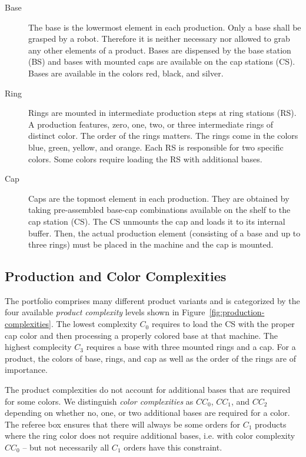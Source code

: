 \documentclass[12pt,twoside]{article}
\newcommand{\reffig}[1]{Figure~\ref{#1}}
\begin{document}
\begin{description}
\item[Base] The base is the lowermost element in each production. Only
  a base shall be grasped by a robot. Therefore it is neither
  necessary nor allowed to grab any other elements of a product. Bases
  are dispensed by the base station (BS) and bases with mounted caps
  are available on the cap stations (CS). Bases are available in the
  colors red, black, and silver.
\item[Ring] Rings are mounted in intermediate production steps at ring
  stations (RS). A production features, zero, one, two, or three
  intermediate rings of distinct color. The order of the rings
  matters. The rings come in the colors blue, green, yellow, and
  orange. Each RS is responsible for two specific colors. Some colors
  require loading the RS with additional bases.
\item[Cap] Caps are the topmost element in each production. They are
  obtained by taking pre-assembled base-cap combinations available on
  the shelf to the cap station (CS). The CS unmounts the cap and loads
  it to its internal buffer. Then, the actual production element
  (consisting of a base and up to three rings) must be placed in the
  machine and the cap is mounted.
\end{description}

\subsection{Production and Color Complexities}
\label{sec:production-complexities}
The portfolio comprises many different product variants and is
categorized by the four available \emph{product complexity} levels
shown in \reffig{fig:production-complexities}. The lowest complexity
$C_0$ requires to load the CS with the proper cap color and then
processing a properly colored base at that machine. The highest
complecity $C_3$ requires a base with three mounted rings and a
cap. For a product, the colors of base, rings, and cap as well as the
order of the rings are of importance.

The product complexities do not account for additional bases that are
required for some colors. We distinguish \emph{color complexities} as
$CC_0$, $CC_1$, and $CC_2$ depending on whether no, one, or two
additional bases are required for a color. The referee box ensures
that there will always be some orders for $C_1$ products where the
ring color does not require additional bases, i.e. with color
complexity $CC_0$ -- but not necessarily all $C_1$ orders have this
constraint.
\end{document}
